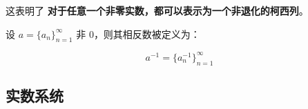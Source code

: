 \maketip 这表明了 \textbf{对于任意一个非零实数，都可以表示为一个非退化的柯西列}。

\begin{definition}[相反数]
	设 $a = \{a_n\}^\infty_{n=1}$ 非 $0$，则其相反数被定义为：
	
	$$
	a^{-1} = \{a_n^{-1}\} _{n=1}^\infty
	$$
\end{definition}

\subsection{实数系统}



















